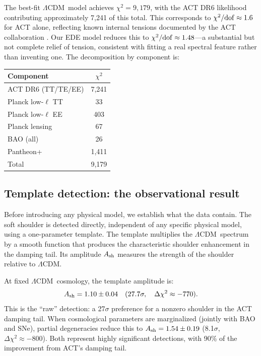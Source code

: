 \documentclass[twocolumn,showpacs,preprintnumbers,amsmath,amssymb,prd]{revtex4-2}
\newcommand{\lcdm}{$\Lambda$CDM}
\begin{document}
The best-fit \lcdm\ model achieves $\chi^2 = 9{,}179$, with the ACT DR6 
likelihood contributing approximately 7,241 of this total. This corresponds 
to $\chi^2/{\rm dof} \approx 1.6$ for ACT alone, reflecting known internal 
tensions documented by the ACT collaboration \cite{ACT2024}. Our EDE model 
reduces this to $\chi^2/{\rm dof} \approx 1.48$---a substantial but not 
complete relief of tension, consistent with fitting a real spectral feature 
rather than inventing one. The decomposition by 
component is:
\begin{center}
\begin{tabular}{lc}
\toprule
Component & $\chi^2$ \\
\midrule
ACT DR6 (TT/TE/EE) & 7,241 \\
Planck low-$\ell$ TT & 33 \\
Planck low-$\ell$ EE & 403 \\
Planck lensing & 67 \\
BAO (all) & 26 \\
Pantheon+ & 1,411 \\
\midrule
Total & 9,179 \\
\bottomrule
\end{tabular}
\end{center}

\subsection{Template detection: the observational result}
\label{sec:template}

Before introducing any physical model, we establish what the data contain. 
The soft shoulder is detected directly, independent of any specific physical 
model, using a one-parameter template. The template multiplies the \lcdm\ 
spectrum by a smooth function that produces the characteristic shoulder 
enhancement in the damping tail. Its amplitude $A_{\rm sh}$ measures the 
strength of the shoulder relative to \lcdm.

At fixed \lcdm\ cosmology, the template amplitude is:
\begin{equation}
A_{\rm sh} = 1.10 \pm 0.04 \quad (27.7\sigma, \quad \Delta\chi^2 \approx -770).
\end{equation}
This is the ``raw'' detection: a 27$\sigma$ preference for a nonzero 
shoulder in the ACT damping tail. When cosmological parameters are 
marginalized (jointly with BAO and SNe), partial degeneracies reduce 
this to $A_{\rm sh} = 1.54 \pm 0.19$ (8.1$\sigma$, $\Delta\chi^2 \approx -800$). 
Both represent highly significant detections, with 90\% of the improvement 
from ACT's damping tail.
\end{document}
